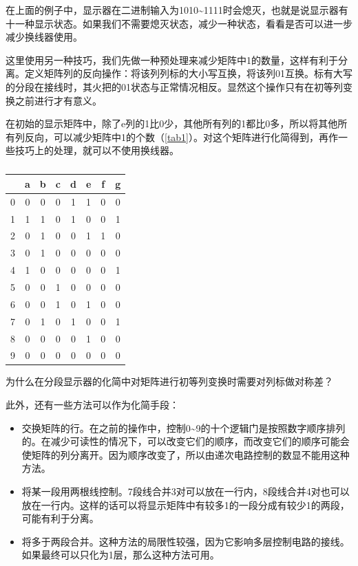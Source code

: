在上面的例子中，显示器在二进制输入为1010\~{}1111时会熄灭，也就是说显示器有十一种显示状态。如果我们不需要熄灭状态，减少一种状态，看看是否可以进一步减少换线器使用。

这里使用另一种技巧，我们先做一种预处理来减少矩阵中1的数量，这样有利于分离。定义矩阵列的反向操作：将该列列标的大小写互换，将该列01互换。标有大写的分段在接线时，其火把的01状态与正常情况相反。显然这个操作只有在初等列变换之前进行才有意义。

在初始的显示矩阵中，除了e列的1比0少，其他所有列的1都比0多，所以将其他所有列反向，可以减少矩阵中1的个数（\autoref{tab1}）。对这个矩阵进行化简得到，再作一些技巧上的处理，就可以不使用换线器。

\begin{table}[!ht]
  \centering
  \begin{tabular}{c|ccccccc}
      & a & b & c & d & e & f & g \\\hline
    0 & 0 & 0 & 0 & 1 & 1 & 0 & 0 \\
    1 & 1 & 1 & 0 & 1 & 0 & 0 & 1 \\
    2 & 0 & 1 & 0 & 0 & 1 & 1 & 0 \\
    3 & 0 & 1 & 0 & 0 & 0 & 0 & 0 \\
    4 & 1 & 0 & 0 & 0 & 0 & 0 & 1 \\
    5 & 0 & 0 & 1 & 0 & 0 & 0 & 0 \\
    6 & 0 & 0 & 1 & 0 & 1 & 0 & 0 \\
    7 & 0 & 1 & 0 & 1 & 0 & 0 & 1 \\
    8 & 0 & 0 & 0 & 0 & 1 & 0 & 0 \\
    9 & 0 & 0 & 0 & 0 & 0 & 0 & 0
  \end{tabular}
  \caption{}\label{tab1}
\end{table}

\begin{problem}{}{}
  为什么在分段显示器的化简中对矩阵进行初等列变换时需要对列标做对称差？
\end{problem}

此外，还有一些方法可以作为化简手段：
\begin{itemize}
  \item 交换矩阵的行。在之前的操作中，控制0\~{}9的十个逻辑门是按照数字顺序排列的。在减少可读性的情况下，可以改变它们的顺序，而改变它们的顺序可能会使矩阵的列分离开。因为顺序改变了，所以由递次电路控制的数显不能用这种方法。
  \item 将某一段用两根线控制。7段线合并3对可以放在一行内，8段线合并4对也可以放在一行内。这样的话可以将显示矩阵中有较多1的一段分成有较少1的两段，可能有利于分离。
  \item 将多于两段合并。这种方法的局限性较强，因为它影响多层控制电路的接线。如果最终可以只化为1层，那么这种方法可用。
\end{itemize}


